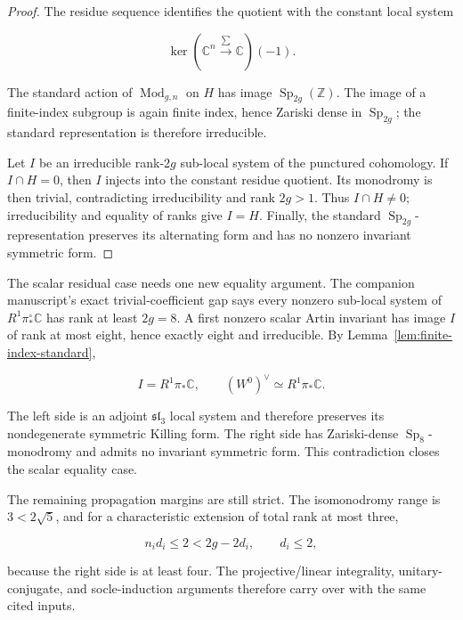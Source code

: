 \documentclass[11pt]{article}
\theoremstyle{definition}
\newcommand{\Mod}{\operatorname{Mod}}
\newcommand{\Sp}{\operatorname{Sp}}
\begin{document}
\begin{proof}
The residue sequence identifies the quotient with the constant local system

\[\ker\!\left(\mathbb C^n\xrightarrow{\sum}\mathbb C\right)(-1).\]

The standard action of \(\Mod_{g,n}\) on \(H\) has image
\(\Sp_{2g}(\mathbb Z)\).  The image of a finite-index subgroup is again
finite index, hence Zariski dense in \(\Sp_{2g}\); the standard
representation is therefore irreducible.

Let \(I\) be an irreducible rank-\(2g\) sub-local system of the punctured
cohomology.  If \(I\cap H=0\), then \(I\) injects into the constant residue
quotient.  Its monodromy is then trivial, contradicting irreducibility and
rank \(2g>1\).  Thus \(I\cap H\ne0\); irreducibility and equality of ranks
give \(I=H\).  Finally, the standard \(\Sp_{2g}\)-representation preserves
its alternating form and has no nonzero invariant symmetric form.
\end{proof}

The scalar residual case needs one new equality argument. The companion
manuscript's exact trivial-coefficient gap \cite{SneidermanG5} says every nonzero
sub-local system of \(R^1\pi_*^\circ\mathbb C\) has rank at least
\(2g=8\). A first nonzero scalar Artin invariant has image \(I\) of rank
at most eight, hence exactly eight and irreducible. By
Lemma~\ref{lem:finite-index-standard},

\[I=R^1\pi_*\mathbb C,
\qquad (W^0)^\vee\simeq R^1\pi_*\mathbb C.\]

The left side is an adjoint \(\mathfrak{sl}_3\) local system and therefore
preserves its nondegenerate symmetric Killing form. The right side has
Zariski-dense \(\Sp_8\)-monodromy and admits no invariant symmetric form.
This contradiction closes the scalar equality case.

The remaining propagation margins are still strict. The isomonodromy
range is \(3<2\sqrt5\), and for a characteristic extension of total rank
at most three,

\[n_i d_i\le2<2g-2d_i,
\qquad d_i\le2,\]

because the right side is at least four. The projective/linear
integrality, unitary-conjugate, and socle-induction arguments therefore
carry over with the same cited inputs.
\end{document}
